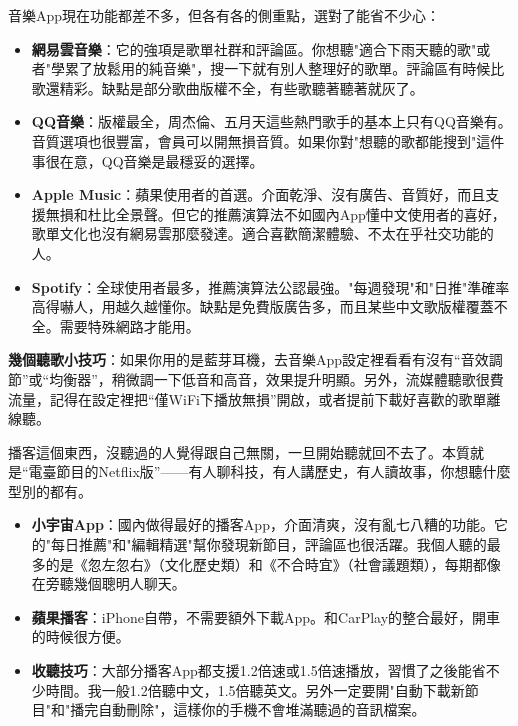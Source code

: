 


音樂App現在功能都差不多，但各有各的側重點，選對了能省不少心：

\begin{itemize}
  \item \textbf{網易雲音樂}：它的強項是歌單社群和評論區。你想聽"適合下雨天聽的歌"或者"學累了放鬆用的純音樂"，搜一下就有別人整理好的歌單。評論區有時候比歌還精彩。缺點是部分歌曲版權不全，有些歌聽著聽著就灰了。
  \item \textbf{QQ音樂}：版權最全，周杰倫、五月天這些熱門歌手的基本上只有QQ音樂有。音質選項也很豐富，會員可以開無損音質。如果你對"想聽的歌都能搜到"這件事很在意，QQ音樂是最穩妥的選擇。
  \item \textbf{Apple Music}：蘋果使用者的首選。介面乾淨、沒有廣告、音質好，而且支援無損和杜比全景聲。但它的推薦演算法不如國內App懂中文使用者的喜好，歌單文化也沒有網易雲那麼發達。適合喜歡簡潔體驗、不太在乎社交功能的人。
  \item \textbf{Spotify}：全球使用者最多，推薦演算法公認最強。"每週發現"和"日推"準確率高得嚇人，用越久越懂你。缺點是免費版廣告多，而且某些中文歌版權覆蓋不全。需要特殊網路才能用。
\end{itemize}

\textbf{幾個聽歌小技巧}：如果你用的是藍芽耳機，去音樂App設定裡看看有沒有“音效調節”或“均衡器”，稍微調一下低音和高音，效果提升明顯。另外，流媒體聽歌很費流量，記得在設定裡把“僅WiFi下播放無損”開啟，或者提前下載好喜歡的歌單離線聽。


播客這個東西，沒聽過的人覺得跟自己無關，一旦開始聽就回不去了。本質就是“電臺節目的Netflix版”——有人聊科技，有人講歷史，有人讀故事，你想聽什麼型別的都有。

\begin{itemize}
  \item \textbf{小宇宙App}：國內做得最好的播客App，介面清爽，沒有亂七八糟的功能。它的"每日推薦"和"編輯精選"幫你發現新節目，評論區也很活躍。我個人聽的最多的是《忽左忽右》（文化歷史類）和《不合時宜》（社會議題類），每期都像在旁聽幾個聰明人聊天。
  \item \textbf{蘋果播客}：iPhone自帶，不需要額外下載App。和CarPlay的整合最好，開車的時候很方便。
  \item \textbf{收聽技巧}：大部分播客App都支援1.2倍速或1.5倍速播放，習慣了之後能省不少時間。我一般1.2倍聽中文，1.5倍聽英文。另外一定要開"自動下載新節目"和"播完自動刪除"，這樣你的手機不會堆滿聽過的音訊檔案。
\end{itemize}

